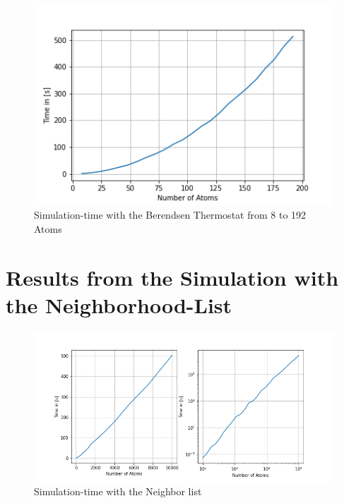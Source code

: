 \begin{figure}[!h]
	\begin{center}
		\includegraphics[scale=1]{Figure/plotAtomTimes.png}
	\end{center}
	\caption[Simulation-time with the Berendsen Thermostat from 8 to 192 Atoms]{Simulation-time with the Berendsen Thermostat from 8 to 192 Atoms }
	\label{PlotSimulationTimeBerendsenThermostat}
\end{figure}


\section{Results from the Simulation with the Neighborhood-List}

\begin{figure}[!h]
	\begin{center}
		\includegraphics[scale=1.25]{Figure/plotAtomTimesMoreData.png}
	\end{center}
	\caption[Simulation-time with the Neighbor-list]{Simulation-time with the Neighbor list}
	\label{PlotSimulationTimesCutoffNew}
\end{figure}

